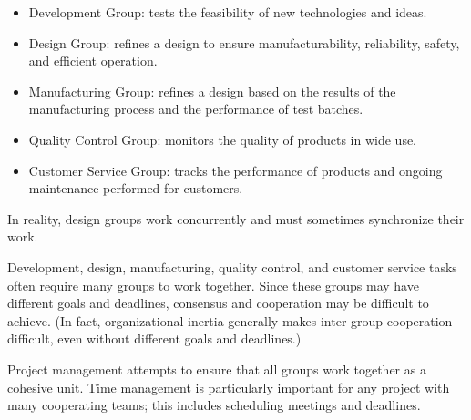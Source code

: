 \begin{itemize}
\item Development Group: tests the feasibility of new technologies and ideas.
\item Design Group: refines a design to ensure manufacturability, reliability, safety, and efficient operation.
\item Manufacturing Group: refines a design based on the results of the manufacturing process and the performance of test batches.
\item Quality Control Group: monitors the quality of products in wide use.
\item Customer Service Group: tracks the performance of products and ongoing maintenance performed for customers.
\end{itemize}

In reality, design groups work concurrently and must sometimes
synchronize their work. 

Development, design, manufacturing, quality control, and customer
service tasks often require many groups to work together. Since these
groups may have different goals and deadlines, consensus and
cooperation may be difficult to achieve. (In fact, organizational
inertia generally makes inter-group cooperation difficult, even
without different goals and deadlines.)

Project management attempts to ensure that all groups work together as
a cohesive unit. Time management is particularly important for any
project with many cooperating teams; this includes scheduling meetings
and deadlines.







